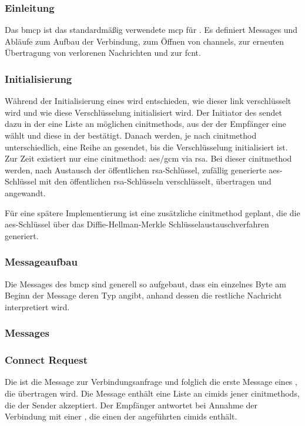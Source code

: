 \subsubsection{Einleitung}
Das \acrfull{bmcp} ist das standardmäßig verwendete \gls{mcp} für
.
Es definiert Messages und Abläufe zum Aufbau der Verbindung, zum Öffnen von
\glspl{channel}, zur erneuten Übertragung von verlorenen Nachrichten und zur
\gls{fcnt}.

\subsubsection{Initialisierung}
Während der Initialisierung eines  wird entschieden, wie
dieser \gls{link} verschlüsselt wird und wie diese Verschlüsselung initialisiert
wird.
Der Initiator des  sendet dazu in der \msg{\bmcpconnectreq}
eine Liste an möglichen \glspl{cinitmethod}, aus der der Empfänger eine wählt
und diese in der \msg{\bmcpconnectrep} bestätigt.
Danach werden, je nach \gls{cinitmethod} unterschiedlich, eine Reihe an
\msgpl{\bmcpcryptoinit} gesendet, bis die Verschlüsselung initialisiert ist.
Zur Zeit existiert nur eine \gls{cinitmethod}: \gls{aes}/\gls{gcm} via
\gls{rsa}.
Bei dieser \gls{cinitmethod} werden, nach Austausch der öffentlichen
\gls{rsa}-Schlüssel, zufällig generierte \gls{aes}-Schlüssel mit den
öffentlichen \gls{rsa}-Schlüsseln verschlüsselt, übertragen und angewandt.

Für eine spätere Implementierung ist eine zusätzliche \gls{cinitmethod} geplant,
die die \gls{aes}-Schlüssel über das Diffie-Hellman-Merkle
Schlüsselaustauschverfahren generiert.

\subsubsection{Messageaufbau}
Die Messages des \acrlong{bmcp} sind generell so aufgebaut, dass ein einzelnes
Byte am Beginn der Message deren Typ angibt, anhand dessen die restliche
Nachricht interpretiert wird.

\bmcpbytefield

\subsubsection{Messages}

\subsubsection*{Connect Request}
\label{dcl-bmcp-connectreq}
Die \msg{\bmcpconnectreq} ist die Message zur Verbindungsanfrage und folglich
die erste Message eines , die übertragen wird.
Die Message enthält eine Liste an \glspl{cimid} jener \glspl{cinitmethod}, die
der Sender akzeptiert.
Der Empfänger antwortet bei Annahme der Verbindung mit einer
\msg{\bmcpconnectrep}, die einen der angeführten \glspl{cimid} enthält.

